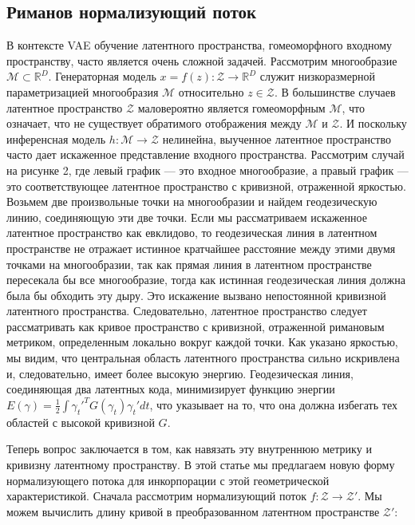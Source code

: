 \documentclass{article}
\begin{document}
\subsection{Риманов нормализующий поток}
В контексте VAE обучение латентного пространства, гомеоморфного входному пространству, часто является очень сложной задачей. Рассмотрим многообразие \(\mathcal{M} \subset \mathbb{R}^D\). Генераторная модель \(x = f(z): \mathcal{Z} \rightarrow \mathbb{R}^D\) служит низкоразмерной параметризацией многообразия \(\mathcal{M}\) относительно \(z \in \mathcal{Z}\). В большинстве случаев латентное пространство \(\mathcal{Z}\) маловероятно является гомеоморфным \(\mathcal{M}\), что означает, что не существует обратимого отображения между \(\mathcal{M}\) и \(\mathcal{Z}\). И поскольку инференсная модель \(h: \mathcal{M} \rightarrow \mathcal{Z}\) нелинейна, выученное латентное пространство часто дает искаженное представление входного пространства. Рассмотрим случай на рисунке 2, где левый график — это входное многообразие, а правый график — это соответствующее латентное пространство с кривизной, отраженной яркостью. Возьмем две произвольные точки на многообразии и найдем геодезическую линию, соединяющую эти две точки. Если мы рассматриваем искаженное латентное пространство как евклидово, то геодезическая линия в латентном пространстве не отражает истинное кратчайшее расстояние между этими двумя точками на многообразии, так как прямая линия в латентном пространстве пересекала бы все многообразие, тогда как истинная геодезическая линия должна была бы обходить эту дыру. Это искажение вызвано непостоянной кривизной латентного пространства. Следовательно, латентное пространство следует рассматривать как кривое пространство с кривизной, отраженной римановым метриком, определенным локально вокруг каждой точки. Как указано яркостью, мы видим, что центральная область латентного пространства сильно искривлена и, следовательно, имеет более высокую энергию. Геодезическая линия, соединяющая два латентных кода, минимизирует функцию энергии \(E(\gamma) = \frac{1}{2} \int \gamma_t'^T G(\gamma_t) \gamma_t' dt\), что указывает на то, что она должна избегать тех областей с высокой кривизной \(G\).

Теперь вопрос заключается в том, как навязать эту внутреннюю метрику и кривизну латентному пространству. В этой статье мы предлагаем новую форму нормализующего потока для инкорпорации с этой геометрической характеристикой. Сначала рассмотрим нормализующий поток \(f: \mathcal{Z} \rightarrow \mathcal{Z}'\). Мы можем вычислить длину кривой в преобразованном латентном пространстве \(\mathcal{Z}'\):
\end{document}
